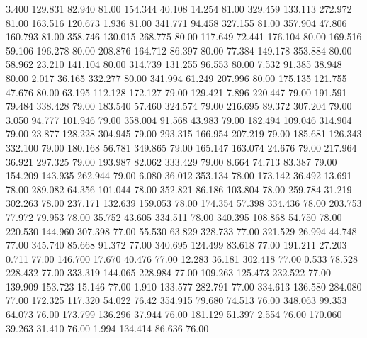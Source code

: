    3.400  129.831   82.940        81.00
 154.344   40.108   14.254        81.00
 329.459  133.113  272.972        81.00
 163.516  120.673    1.936        81.00
 341.771   94.458  327.155        81.00
 357.904   47.806  160.793        81.00
 358.746  130.015  268.775        80.00
 117.649   72.441  176.104        80.00
 169.516   59.106  196.278        80.00
 208.876  164.712   86.397        80.00
  77.384  149.178  353.884        80.00
  58.962   23.210  141.104        80.00
 314.739  131.255   96.553        80.00
   7.532   91.385   38.948        80.00
   2.017   36.165  332.277        80.00
 341.994   61.249  207.996        80.00
 175.135  121.755   47.676        80.00
  63.195  112.128  172.127        79.00
 129.421    7.896  220.447        79.00
 191.591   79.484  338.428        79.00
 183.540   57.460  324.574        79.00
 216.695   89.372  307.204        79.00
   3.050   94.777  101.946        79.00
 358.004   91.568   43.983        79.00
 182.494  109.046  314.904        79.00
  23.877  128.228  304.945        79.00
 293.315  166.954  207.219        79.00
 185.681  126.343  332.100        79.00
 180.168   56.781  349.865        79.00
 165.147  163.074   24.676        79.00
 217.964   36.921  297.325        79.00
 193.987   82.062  333.429        79.00
   8.664   74.713   83.387        79.00
 154.209  143.935  262.944        79.00
   6.080   36.012  353.134        78.00
 173.142   36.492   13.691        78.00
 289.082   64.356  101.044        78.00
 352.821   86.186  103.804        78.00
 259.784   31.219  302.263        78.00
 237.171  132.639  159.053        78.00
 174.354   57.398  334.436        78.00
 203.753   77.972   79.953        78.00
  35.752   43.605  334.511        78.00
 340.395  108.868   54.750        78.00
 220.530  144.960  307.398        77.00
  55.530   63.829  328.733        77.00
 321.529   26.994   44.748        77.00
 345.740   85.668   91.372        77.00
 340.695  124.499   83.618        77.00
 191.211   27.203    0.711        77.00
 146.700   17.670   40.476        77.00
  12.283   36.181  302.418        77.00
   0.533   78.528  228.432        77.00
 333.319  144.065  228.984        77.00
 109.263  125.473  232.522        77.00
 139.909  153.723   15.146        77.00
   1.910  133.577  282.791        77.00
 334.613  136.580  284.080        77.00
 172.325  117.320   54.022        76.42
 354.915   79.680   74.513        76.00
 348.063   99.353   64.073        76.00
 173.799  136.296   37.944        76.00
 181.129   51.397    2.554        76.00
 170.060   39.263   31.410        76.00
   1.994  134.414   86.636        76.00

